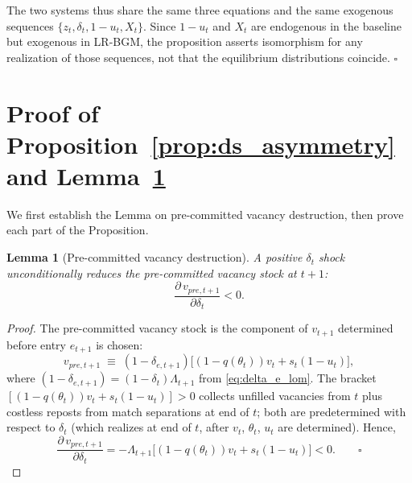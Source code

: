 \documentclass[authoryear, review, 12pt]{elsarticle}
\newtheorem{lemma}{Lemma}
\begin{document}
The two systems thus share the same three equations and
the same exogenous sequences $\{z_t,\delta_t,1-u_t,X_t\}$.
Since $1-u_t$ and $X_t$ are endogenous in the baseline but
exogenous in LR-BGM, the proposition asserts isomorphism
for any realization of those sequences, not that the
equilibrium distributions coincide. \hfill$\square$

\section{Proof of Proposition~\ref{prop:ds_asymmetry}
	and Lemma~\ref{lem:vpre}}
\label{app:proof_ds}

We first establish the Lemma on pre-committed vacancy destruction,
then prove each part of the Proposition.

\begin{lemma}[Pre-committed vacancy destruction]
\label{lem:vpre}
A positive $\delta_t$ shock unconditionally reduces the
pre-committed vacancy stock at $t+1$: 
\[
	\frac{\partial\,v_{pre,t+1}}{\partial\delta_t} < 0.
\]
\end{lemma}

\begin{proof}
The pre-committed vacancy stock is the component of $v_{t+1}$ determined
before entry $e_{t+1}$ is chosen:
\[
	v_{pre,t+1}
	\;\equiv\;
	(1-\delta_{e,t+1})\bigl[(1-q(\theta_t))v_t
	+s_t(1-u_t)\bigr],
\]
where $(1-\delta_{e,t+1})=(1-\delta_t)\Lambda_{t+1}$ from
\eqref{eq:delta_e_lom}.
The bracket $[(1-q(\theta_t))v_t + s_t(1-u_t)]>0$ collects
unfilled vacancies from $t$ plus costless reposts from match
separations at end of $t$; both are predetermined with respect
to $\delta_t$ (which realizes at end of $t$, after $v_t$,
$\theta_t$, $u_t$ are determined). Hence,
\[
	\frac{\partial\,v_{pre,t+1}}{\partial\delta_t}
	= -\Lambda_{t+1}\bigl[(1-q(\theta_t))v_t+s_t(1-u_t)\bigr]
	< 0. \qquad\square
\]
\end{proof}
\end{document}
